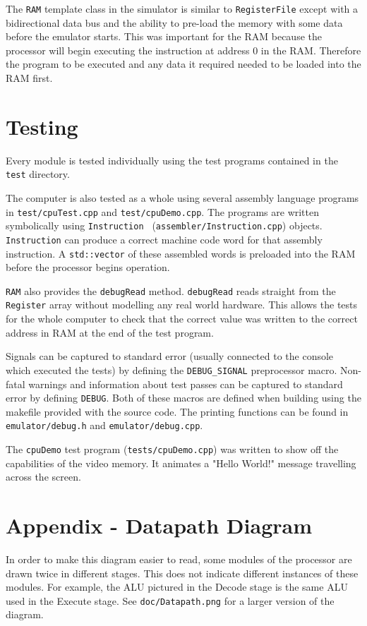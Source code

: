 \documentclass[11pt,a4paper]{IEEEtran}
\begin{document}
				The \texttt{RAM} template class in the simulator is similar to \texttt{RegisterFile} except with a bidirectional data bus and the ability to pre-load the memory with some data before the emulator starts. This was important for the RAM because the processor will begin executing the instruction at address 0 in the RAM. Therefore the program to be executed and any data it required needed to be loaded into the RAM first. 
	
	\section{Testing}
	Every module is tested individually using the test programs contained in the \texttt{test} directory. 
	
	The computer is also tested as a whole using several assembly language programs in \texttt{test/cpuTest.cpp} and \texttt{test/cpuDemo.cpp}. The programs are written symbolically using \texttt{Instruction } (\texttt{assembler/Instruction.cpp}) objects. \texttt{Instruction} can produce a correct machine code word for that assembly instruction. A \texttt{std::vector} of these assembled words is preloaded into the RAM before the processor begins operation.
	
	\texttt{RAM} also provides the \texttt{debugRead} method. \texttt{debugRead} reads straight from the \texttt{Register} array without modelling any real world hardware. This allows the tests for the whole computer to check that the correct value was written to the correct address in RAM at the end of the test program. 
	
	Signals can be captured to standard error (usually connected to the console which executed the tests) by defining the \texttt{DEBUG\_SIGNAL} preprocessor macro. Non-fatal warnings and information about test passes can be captured to standard error by defining \texttt{DEBUG}. Both of these macros are defined when building using the makefile provided with the source code. The printing functions can be found in \texttt{emulator/debug.h} and \texttt{emulator/debug.cpp}. 
	
	The \texttt{cpuDemo} test program (\texttt{tests/cpuDemo.cpp}) was written to show off the capabilities of the video memory. It animates a "Hello World!" message travelling across the screen.
	\printbibliography	
	\section{Appendix - Datapath Diagram}
	\label{Sec::Datapath}
	In order to make this diagram easier to read, some modules of the processor are drawn twice in different stages. This does not indicate different instances of these modules. For example, the ALU pictured in the Decode stage is the same ALU used in the Execute stage. See \texttt{doc/Datapath.png} for a larger version of the diagram.
\end{document}
